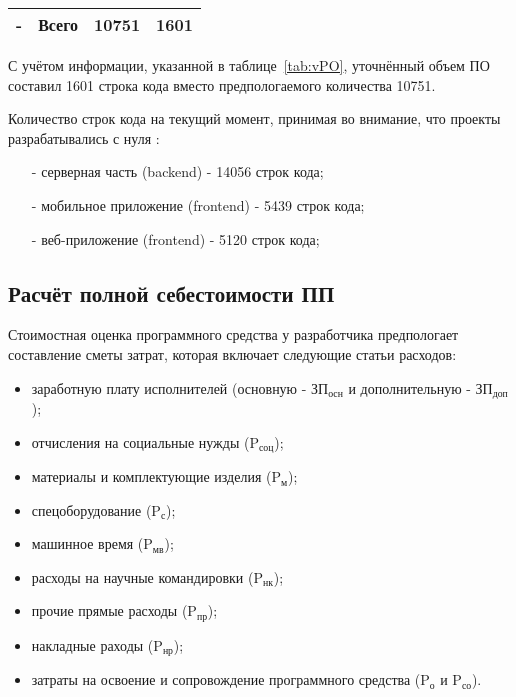 \begin{table}[h!]
\begin{tabular}{|p{1cm}|p{8.5cm}|p{3cm}|p{3cm}|}
        \multicolumn{1}{|c|}{-}   & Всего                                                   & \multicolumn{1}{r|}{10751}& \multicolumn{1}{r|}{1601} \\ \hline
    \end{tabular}
\end{table}

С учётом информации, указанной в таблице~\ref{tab:vPO}, уточнённый объем ПО составил 1601 строка кода
вместо предпологаемого количества 10751.

Количество строк кода на текущий момент, принимая во внимание, что проекты разрабатывались с нуля \cite{LinuxCloc}:
\begin{enumerate}
    \item[-] серверная часть (backend) - 14056 строк кода;
    \item[-] мобильное приложение (frontend) - 5439 строк кода;
    \item[-] веб-приложение (frontend) - 5120 строк кода;
\end{enumerate}

\subsection{Расчёт полной себестоимости ПП}

Стоимостная оценка программного средства у разработчика предпологает составление сметы затрат,
которая включает следующие статьи расходов:

\begin{itemize}
    \item заработную плату исполнителей (основную - $\text{ЗП}_{\text{осн}}$ и дополнительную - $\text{ЗП}_{\text{доп}}$);
    \item отчисления на социальные нужды ($\text{P}_{\text{соц}}$);
    \item материалы и комплектующие изделия ($\text{P}_{\text{м}}$);
    \item спецоборудование ($\text{P}_{\text{с}}$);
    \item машинное время ($\text{P}_{\text{мв}}$);
    \item расходы на научные командировки ($\text{P}_{\text{нк}}$);
    \item прочие прямые расходы ($\text{P}_{\text{пр}}$);
    \item накладные раходы ($\text{P}_{\text{нр}}$);
    \item затраты на освоение и сопровождение программного средства ($\text{P}_{\text{о}}$ и $\text{P}_{\text{со}}$).
\end{itemize}

